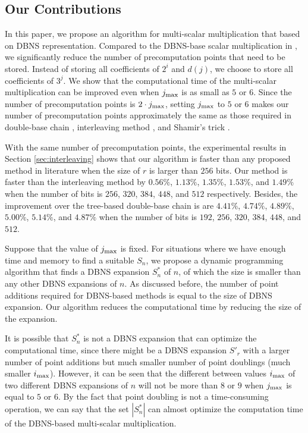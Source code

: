 \subsection{Our Contributions}

In this paper, we propose an algorithm for multi-scalar multiplication that based on DBNS representation.
Compared to the DBNS-base scalar multiplication in \cite{dbns},
we significantly reduce the number of precomputation points that need to be stored.
Instead of storing all coefficients of $2^i$ and $d(j)$, we choose to store all coefficients of $3^j$.
We show that the computational time of the multi-scalar multiplication can be improved even when $j_{\rm max}$ is as small as $5$ or $6$.
Since the number of precomputation points is $2 \cdot j_{\rm max}$,
setting $j_{\rm max}$ to $5$ or $6$ makes our number of precomputation points approximately the same as those required in
double-base chain \cite{experiment,dbc1}, interleaving method \cite{interleaving}, and Shamir's trick \cite{enlarged4}.

With the same number of precomputation points, the experimental results in Section \ref{sec:interleaving}
shows that our algorithm is faster than any proposed method in literature when the size of $r$ is larger than $256$ bits.
Our method is faster than the interleaving method by $0.56\%$, $1.13\%$, $1.35\%$, $1.53\%$, and $1.49\%$
when the number of bits is $256$, $320$, $384$, $448$, and $512$ respectively.
Besides, the improvement over the tree-based double-base chain is are 
$4.41\%$, $4.74\%$, $4.89\%$, $5.00\%$, $5.14\%$, and $4.87\%$ when the number of bits is $192$, $256$, $320$, $384$, $448$, and $512$.

Suppose that the value of $j_{\rm max}$ is fixed.
For situations where we have enough time and memory to find a suitable $S_n$,
we propose a dynamic programming algorithm that finds a DBNS expansion $S^*_n$ of $n$, of which the size is smaller than any other DBNS expansions of $n$.
As discussed before, the number of point additions required for DBNS-based methods is equal to the size of DBNS expansion.
Our algorithm reduces the computational time by reducing the size of the expansion.

It is possible that $S^*_n$ is not a DBNS expansion that can optimize the computational time,
since there might be a DBNS expansion $S'_r$ with a larger number of point additions but much smaller number of point doublings (much smaller $i_{\rm max}$).
However, it can be seen that the different between values $i_{\rm max}$ of two different DBNS expansions of $n$
will not be more than $8$ or $9$ when $j_{\rm max}$ is equal to $5$ or $6$.
By the fact that point doubling is not a time-consuming operation,
we can say that the set $|S^*_n|$ can almost optimize the computation time of the DBNS-based multi-scalar multiplication.

